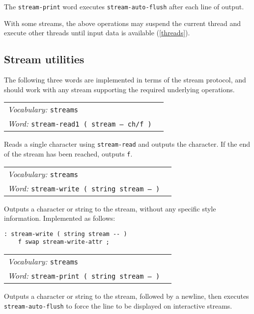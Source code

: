 \documentclass{book}
\newcommand{\vocabulary}[1]{\emph{Vocabulary:} \texttt{#1}&\\}
\newcommand{\ordinaryword}[2]{\index{\texttt{#1}}\emph{Word:} \texttt{#2}&\\}
\newcommand{\wordtable}[1]{


\begin{tabularx}{12cm}{lX}
\hline
#1
\hline
\end{tabularx}

}
\begin{document}
The \texttt{stream-print} word executes \texttt{stream-auto-flush} after each line of output.

With some streams, the above operations may suspend the current thread and execute other threads until input data is available (\ref{threads}).

\subsection{Stream utilities}

The following three words are implemented in terms of the stream protocol, and should work with any stream supporting the required underlying operations.
\wordtable{
\vocabulary{streams}
\ordinaryword{stream-read1}{stream-read1 ( stream -- ch/f )}

}
Reads a single character using \texttt{stream-read} and outputs the character. If the end of the stream has been reached, outputs \texttt{f}.
\wordtable{
\vocabulary{streams}
\ordinaryword{stream-write}{stream-write ( string stream -- )}

}
Outputs a character or string to the stream, without any specific style information. Implemented as follows:
\begin{verbatim}
: stream-write ( string stream -- )
    f swap stream-write-attr ;
\end{verbatim}
\wordtable{
\vocabulary{streams}
\ordinaryword{stream-print}{stream-print ( string stream -- )}

}
Outputs a character or string to the stream, followed by a newline, then executes \texttt{stream-auto-flush} to force the line to be displayed on interactive streams.
\end{document}
